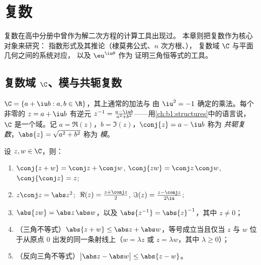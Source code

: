 \chapter{复数}\label{ch:b1:complex}

复数在高中分册中曾作为解二次方程的计算工具出现过。
本章则把复数作为核心对象来研究：
指数形式及其推论（棣莫弗公式、$n$ 次方根、），
复数域 $\C$ 与平面几何之间的系统对应，
以及 $\eu^{\iu\theta}$ 作为
证明三角恒等式的工具。

\section{复数域 $\C$、模与共轭复数}

\begin{definition}[复数域]\label{def:b1:complex:field}
$\C = \{a + \iu b : a, b \in \R\}$，其上通常的加法与
由 $\iu^2 = -1$ 确定的乘法。每个非零的 $z = a + \iu
b$ 有逆元 $z^{-1} = \frac{a - \iu b}{a^2 + b^2}$——用\cref{ch:b1:structures}中的语言说，
$\C$ 是一个域。记 $a =
\Re(z)$，$b = \Im(z)$，$\conj{z} = a - \iu b$ 称为
\emph{共轭复数}，$\abs{z} = \sqrt{a^2 + b^2}$ 称为
\emph{模}。
\end{definition}

\begin{proposition}[共轭与模的运算规则]\label{prop:b1:complex:rules}
设 $z, w \in \C$，则：
\begin{enumerate}
  \item $\conj{z + w} = \conj z + \conj w$, $\conj{zw} = \conj z\,
        \conj w$, $\conj{\conj z} = z$;
  \item $z \conj z = \abs z^2$; $\;\Re(z) = \frac{z + \conj z}{2}$,
        $\Im(z) = \frac{z - \conj z}{2\iu}$;
  \item $\abs{zw} = \abs z\, \abs w$，以及 $\abs{z^{-1}} =
        \abs{z}^{-1}$，其中 $z \neq 0$；
  \item （三角不等式）$\abs{z + w}
        \leq \abs z + \abs w$，等号成立当且仅当 $z$ 与
        $w$ 位于从原点 $0$ 出发的同一条射线上（$w = \lambda z$ 或
        $z = \lambda w$，其中 $\lambda \geq 0$）；
  \item （反向三角不等式）$\bigl|\abs z - \abs w\bigr|
        \leq \abs{z - w}$。
\end{enumerate}
\end{proposition}


